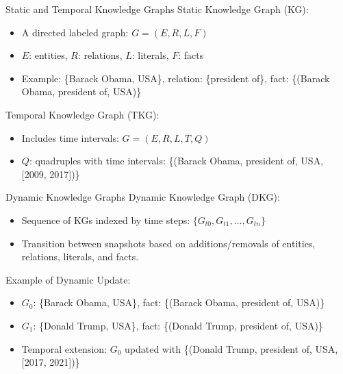\documentclass{beamer}
\begin{document}
    \begin{frame}{Static and Temporal Knowledge Graphs}
        Static Knowledge Graph (KG):
        \begin{itemize}
            \item A directed labeled graph: \( G = (E, R, L, F) \)
            \item \( E \): entities, \( R \): relations, \( L \): literals, \( F \): facts
            \item Example: \{Barack Obama, USA\}, relation: \{president of\}, fact: \{(Barack Obama, president of, USA)\}
        \end{itemize}
        Temporal Knowledge Graph (TKG):
        \begin{itemize}
            \item Includes time intervals: \( G = (E, R, L, T, Q) \)
            \item \( Q \): quadruples with time intervals: \{(Barack Obama, president of, USA, [2009, 2017])\}
        \end{itemize}
    \end{frame}

    \begin{frame}{Dynamic Knowledge Graphs}
        Dynamic Knowledge Graph (DKG):
        \begin{itemize}
            \item Sequence of KGs indexed by time steps: \( \{G_{t0}, G_{t1}, \dots, G_{tn}\} \)
            \item Transition between snapshots based on additions/removals of entities, relations, literals, and facts.
        \end{itemize}
        Example of Dynamic Update:
        \begin{itemize}
            \item \( G_0 \): \{Barack Obama, USA\}, fact: \{(Barack Obama, president of, USA)\}
            \item \( G_1 \): \{Donald Trump, USA\}, fact: \{(Donald Trump, president of, USA)\}
            \item Temporal extension: \( G_0 \) updated with \{(Donald Trump, president of, USA, [2017, 2021])\}
        \end{itemize}
    \end{frame}
    
\end{document}
